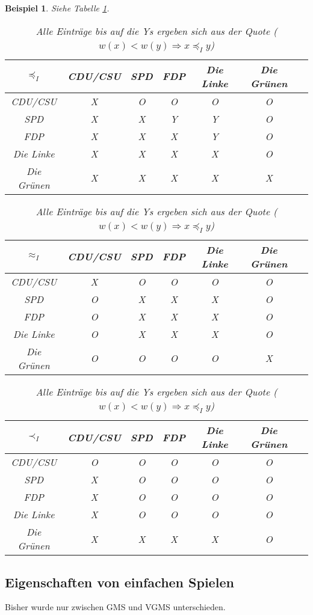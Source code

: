 \documentclass[ngerman]{scrartcl}
\theoremstyle{custom}
\newtheorem{mex}[mdef]{Beispiel}
\newcommand{\0}{\mathbf{0}}
\newcommand{\1}{\mathbf{L}}
\newcommand{\ww}{\preccurlyeq _{I}}
\begin{document}
\begin{mex}
Siehe Tabelle \ref{tab:wwr}.
\begin{table}
\begin{centering}
\begin{tabular}[h]{|c|c|c|c|c|c|c|}
\hline $\ww$ & CDU/CSU & SPD & FDP & Die Linke & Die Gr\"unen \\
\hline CDU/CSU & X & O & O & O & O \\
\hline SPD & X & X & Y & Y & O \\
\hline FDP & X & X & X & Y & O \\
\hline Die Linke & X & X & X & X & O \\
\hline Die Gr\"unen & X & X & X & X & X \\
\hline
\end{tabular}


\begin{tabular}[h]{|c|c|c|c|c|c|c|}
\hline $\approx_I$ & CDU/CSU & SPD & FDP & Die Linke & Die Gr\"unen \\
\hline CDU/CSU & X & O & O & O & O \\
\hline SPD & O & X & X & X & O \\
\hline FDP & O & X & X & X & O \\
\hline Die Linke & O & X & X & X & O \\
\hline Die Gr\"unen & O & O & O & O & X \\
\hline
\end{tabular}

\begin{tabular}[h]{|c|c|c|c|c|c|c|}
\hline $\prec_I$ & CDU/CSU & SPD & FDP & Die Linke & Die Gr\"unen \\
\hline CDU/CSU & O & O & O & O & O \\
\hline SPD & X & O & O & O & O \\
\hline FDP & X & O & O & O & O \\
\hline Die Linke & X & O & O & O & O \\
\hline Die Gr\"unen & X & X & X & X & O \\
\hline
\end{tabular}
\caption{Alle Eintr\"age bis auf die Ys ergeben sich aus der Quote
  ($w(x) < w(y) \Rightarrow x \ww y$)}
\end{centering}
\label{tab:wwr}
\end{table}
\end{mex}

\subsection{Eigenschaften von einfachen Spielen}
Bisher wurde nur zwischen GMS und VGMS unterschieden.
\end{document}
